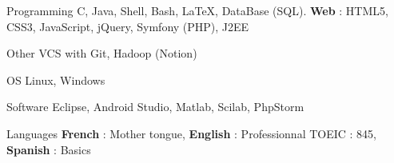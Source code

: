 

\begin{cvskills}

	\cvskill
		{Programming} %
		{C, Java, Shell, Bash, \LaTeX, DataBase (SQL). \textbf{Web} : HTML5, CSS3, JavaScript, jQuery, Symfony (PHP), J2EE } %

	\cvskill
		{Other} %
		{VCS with Git, Hadoop (Notion)} %

	\cvskill
		{OS} %
		{Linux, Windows} %

	\cvskill
	    {Software} %
	    {Eclipse, Android Studio, Matlab, Scilab, PhpStorm} %

  \cvskill
    {Languages} %
    {\textbf{French} : Mother tongue, \textbf{English}  : Professionnal TOEIC : 845, \textbf{Spanish} : Basics} %

\end{cvskills}
